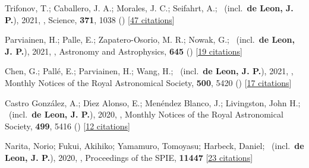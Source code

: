 \item[{\color{numcolor}\scriptsize34}] Trifonov, T.; Caballero, J. A.; Morales, J. C.; Seifahrt, A.; \etal\ (incl.\ \textbf{de Leon, J. P.}), 2021, , Science, \textbf{371}, 1038 () [\href{https://ui.adsabs.harvard.edu/abs/2021Sci...371.1038T}{47 citations}]

\item[{\color{numcolor}\scriptsize33}] Parviainen, H.; Palle, E.; Zapatero-Osorio, M. R.; Nowak, G.; \etal\ (incl.\ \textbf{de Leon, J. P.}), 2021, , Astronomy and Astrophysics, \textbf{645} () [\href{https://ui.adsabs.harvard.edu/abs/2021A&A...645A..16P}{19 citations}]

\item[{\color{numcolor}\scriptsize32}] Chen, G.; Pall{\'e}, E.; Parviainen, H.; Wang, H.; \etal\ (incl.\ \textbf{de Leon, J. P.}), 2021, , Monthly Notices of the Royal Astronomical Society, \textbf{500}, 5420 () [\href{https://ui.adsabs.harvard.edu/abs/2021MNRAS.500.5420C}{17 citations}]

\item[{\color{numcolor}\scriptsize31}] Castro Gonz{\'a}lez, A.; D{\'\i}ez Alonso, E.; Men{\'e}ndez Blanco, J.; Livingston, John H.; \etal\ (incl.\ \textbf{de Leon, J. P.}), 2020, , Monthly Notices of the Royal Astronomical Society, \textbf{499}, 5416 () [\href{https://ui.adsabs.harvard.edu/abs/2020MNRAS.499.5416C}{12 citations}]

\item[{\color{numcolor}\scriptsize30}] Narita, Norio; Fukui, Akihiko; Yamamuro, Tomoyasu; Harbeck, Daniel; \etal\ (incl.\ \textbf{de Leon, J. P.}), 2020, , Proceedings of the SPIE, \textbf{11447} [\href{https://www.spiedigitallibrary.org/conference-proceedings-of-spie/10925/1092507/Focus-adjustable-motion-blur-compensation-method-using-deformable-mirror/10.1117/12.2509567.short}{23 citations}]

